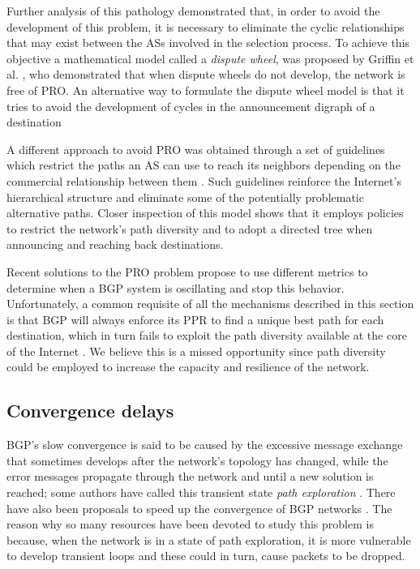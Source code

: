 \documentclass[5p,twocolumn]{elsarticle}
\begin{document}
Further analysis of this pathology \cite{Griffin1999, Griffin2002} demonstrated that, in order to avoid the development of this problem, it is necessary to eliminate the cyclic relationships that may exist between the ASs involved in the selection process. To achieve this objective a mathematical model called a \emph{dispute wheel}, was proposed by Griffin et al.  \cite{Griffin1999, Griffin2002}, who demonstrated that when dispute wheels do not develop, the network is free of PRO. An alternative way to formulate the dispute wheel model is that it tries to avoid the development of cycles in the announcement digraph of a destination

A different approach to avoid PRO was obtained through a set of guidelines which restrict the paths an AS can use to reach its neighbors depending on the commercial relationship between them \cite{Gao2000a}. Such guidelines reinforce the Internet's hierarchical structure and eliminate some of the potentially problematic alternative paths. Closer inspection of this model shows that it employs policies to restrict the network's path diversity and to adopt a directed tree when announcing and reaching back destinations.

Recent solutions to the PRO problem \cite{Cobb2004, Ee2007} propose to use different metrics to determine when a BGP system is oscillating and stop this behavior. Unfortunately, a common requisite of all the mechanisms described in this section is that BGP will always enforce its PPR to find a unique best path for each destination, which in turn fails to exploit the path diversity available at the core of the Internet \cite{Arjona-Villicana2010}. We believe this is a missed opportunity since path diversity could be employed to increase the capacity and resilience of the network.


\subsection{Convergence delays}\label{conv_delays}

BGP's slow convergence is said to be caused by the excessive message exchange that sometimes develops after the network's topology has changed, while the error messages propagate through the network and until a new solution is reached; some authors have called this transient state \emph{path exploration} \cite{Chandrashekar2005}. There have also been proposals to speed up the convergence of BGP networks \cite{Pei2002, Bremler-Barr2003}. The reason why so many resources have been devoted to study this problem is because, when the network is in a state of path exploration, it is more vulnerable to develop transient loops and these could in turn, cause packets to be dropped.
\end{document}
